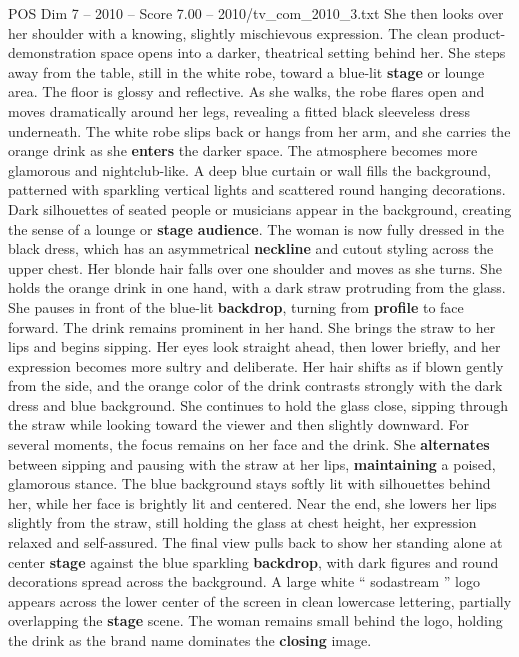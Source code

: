 \begin{textsample}{POS Dim 7 – 2010 – Score 7.00 – 2010/tv\_com\_2010\_3.txt}
She then looks over her shoulder with a knowing, slightly mischievous expression.
The clean product-demonstration space opens into a darker, theatrical setting behind her.
She steps away from the table, still in the white robe, toward a blue-lit \textbf{stage} or lounge area.
The floor is glossy and reflective.
As she walks, the robe flares open and moves dramatically around her legs, revealing a fitted black sleeveless dress underneath.
The white robe slips back or hangs from her arm, and she carries the orange drink as she \textbf{enters} the darker space.
The atmosphere becomes more glamorous and nightclub-like.
A deep blue curtain or wall fills the background, patterned with sparkling vertical lights and scattered round hanging decorations.
Dark silhouettes of seated people or musicians appear in the background, creating the sense of a lounge or \textbf{stage} \textbf{audience}.
The woman is now fully dressed in the black dress, which has an asymmetrical \textbf{neckline} and cutout styling across the upper chest.
Her blonde hair falls over one shoulder and moves as she turns.
She holds the orange drink in one hand, with a dark straw protruding from the glass.
She pauses in front of the blue-lit \textbf{backdrop}, turning from \textbf{profile} to face forward.
The drink remains prominent in her hand.
She brings the straw to her lips and begins sipping.
Her eyes look straight ahead, then lower briefly, and her expression becomes more sultry and deliberate.
Her hair shifts as if blown gently from the side, and the orange color of the drink contrasts strongly with the dark dress and blue background.
She continues to hold the glass close, sipping through the straw while looking toward the viewer and then slightly downward.
For several moments, the focus remains on her face and the drink.
She \textbf{alternates} between sipping and pausing with the straw at her lips, \textbf{maintaining} a poised, glamorous stance.
The blue background stays softly lit with silhouettes behind her, while her face is brightly lit and centered.
Near the end, she lowers her lips slightly from the straw, still holding the glass at chest height, her expression relaxed and self-assured.
The final view pulls back to show her standing alone at center \textbf{stage} against the blue sparkling \textbf{backdrop}, with dark figures and round decorations spread across the background.
A large white “ sodastream ” logo appears across the lower center of the screen in clean lowercase lettering, partially overlapping the \textbf{stage} scene.
The woman remains small behind the logo, holding the drink as the brand name dominates the \textbf{closing} image.

\end{textsample}
